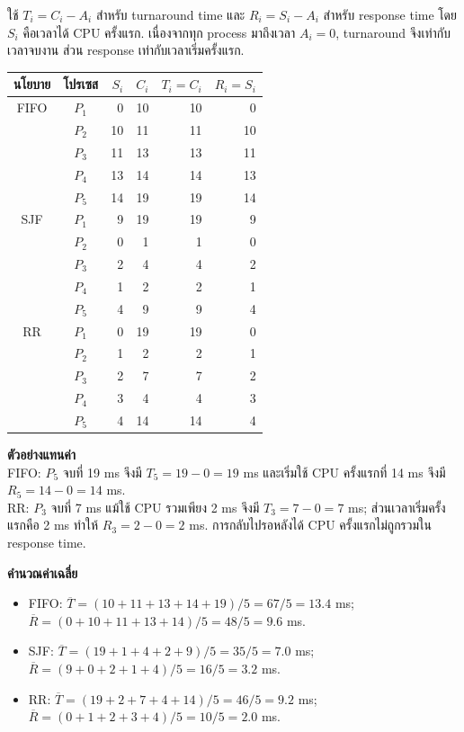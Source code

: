 \newpage{}
\noindent ใช้ $T_i=C_i-A_i$ สำหรับ turnaround time และ $R_i=S_i-A_i$ สำหรับ response time โดย $S_i$ คือเวลาได้ CPU ครั้งแรก. เนื่องจากทุก process มาถึงเวลา $A_i=0$, turnaround จึงเท่ากับเวลาจบงาน ส่วน response เท่ากับเวลาเริ่มครั้งแรก.\par\smallskip
{\small\begin{center}\renewcommand{\arraystretch}{1.12}\begin{tabular}{c|c|r|r|r|r}
นโยบาย & โปรเซส & $S_i$ & $C_i$ & $T_i=C_i$ & $R_i=S_i$\\\hline
FIFO & $P_1$ & 0 & 10 & 10 & 0\\
 & $P_2$ & 10 & 11 & 11 & 10\\
 & $P_3$ & 11 & 13 & 13 & 11\\
 & $P_4$ & 13 & 14 & 14 & 13\\
 & $P_5$ & 14 & 19 & 19 & 14\\\hline
SJF & $P_1$ & 9 & 19 & 19 & 9\\
 & $P_2$ & 0 & 1 & 1 & 0\\
 & $P_3$ & 2 & 4 & 4 & 2\\
 & $P_4$ & 1 & 2 & 2 & 1\\
 & $P_5$ & 4 & 9 & 9 & 4\\\hline
RR & $P_1$ & 0 & 19 & 19 & 0\\
 & $P_2$ & 1 & 2 & 2 & 1\\
 & $P_3$ & 2 & 7 & 7 & 2\\
 & $P_4$ & 3 & 4 & 4 & 3\\
 & $P_5$ & 4 & 14 & 14 & 4\\
\end{tabular}\end{center}}
\noindent\textbf{ตัวอย่างแทนค่า}\\
FIFO: $P_5$ จบที่ 19 ms จึงมี $T_5=19-0=19$ ms และเริ่มใช้ CPU ครั้งแรกที่ 14 ms จึงมี $R_5=14-0=14$ ms.\\
RR: $P_3$ จบที่ 7 ms แม้ใช้ CPU รวมเพียง 2 ms จึงมี $T_3=7-0=7$ ms; ส่วนเวลาเริ่มครั้งแรกคือ 2 ms ทำให้ $R_3=2-0=2$ ms. การกลับไปรอหลังได้ CPU ครั้งแรกไม่ถูกรวมใน response time.\par\medskip
\newpage{}
\noindent\textbf{คำนวณค่าเฉลี่ย}
\begin{itemize}[leftmargin=1.4em,itemsep=.16cm]
\item FIFO: $\overline{T}=(10+11+13+14+19)/5=67/5=13.4$ ms; $\overline{R}=(0+10+11+13+14)/5=48/5=9.6$ ms.
\item SJF: $\overline{T}=(19+1+4+2+9)/5=35/5=7.0$ ms; $\overline{R}=(9+0+2+1+4)/5=16/5=3.2$ ms.
\item RR: $\overline{T}=(19+2+7+4+14)/5=46/5=9.2$ ms; $\overline{R}=(0+1+2+3+4)/5=10/5=2.0$ ms.
\end{itemize}
